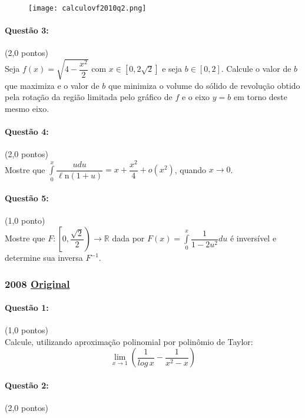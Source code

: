 \documentclass[12pt,a4paper]{article}
\newcommand{\R}{\mathbb{R}}
\newcommand{\Ln}{\ell\mathrm{n}}
\newcommand{\original}[1]{\tiny \href{#1}{Original} \normalsize}
\begin{document}
\begin{figure}[h]
\centering
\texttt{[image: calculovf2010q2.png]}
\end{figure}

\paragraph{Questão 3:}(2,0 pontos)\\
Seja $f(x)=\sqrt{4-\dfrac{x^2}{2}}$ com $x \in [0,2\sqrt{2}]$ e seja $b \in [0,2]$. Calcule o valor de $b$ que maximiza e o valor de $b$ que minimiza o volume do sólido de revolução obtido pela rotação da região limitada pelo gráfico de $f$ e o eixo $y=b$ em torno deste mesmo eixo.

\paragraph{Questão 4:}(2,0 pontos)\\
Mostre que $\displaystyle\int\limits_0^x\dfrac{udu}{\Ln (1+u)}=x+\dfrac{x^2}{4}+o\left(x^2\right)$, quando $x \to 0$.

\paragraph{Questão 5:}(1,0 ponto)\\
Mostre que $F:\left[ 0,\dfrac{\sqrt{2}}{2}\right) \to \R$ dada por $F(x)=\displaystyle\int\limits_0^x\dfrac{1}{1-2u^2}du$ é inversível e determine sua inversa $F^{-1}$.

\newpage

\subsubsection{2008 \original{https://drive.google.com/open?id=1DOQEtUxVQ8cAYAtmib_EV9ZVScSDp58Z}}

\paragraph{Questão 1:}(1,0 pontos)\\
Calcule, utilizando aproximação polinomial por polinômio de Taylor:
$$\lim\limits_{x \to 1}\left(\dfrac{1}{log\,x}-\dfrac{1}{x^2-x}\right)$$

\paragraph{Questão 2:}(2,0 pontos)
\end{document}
